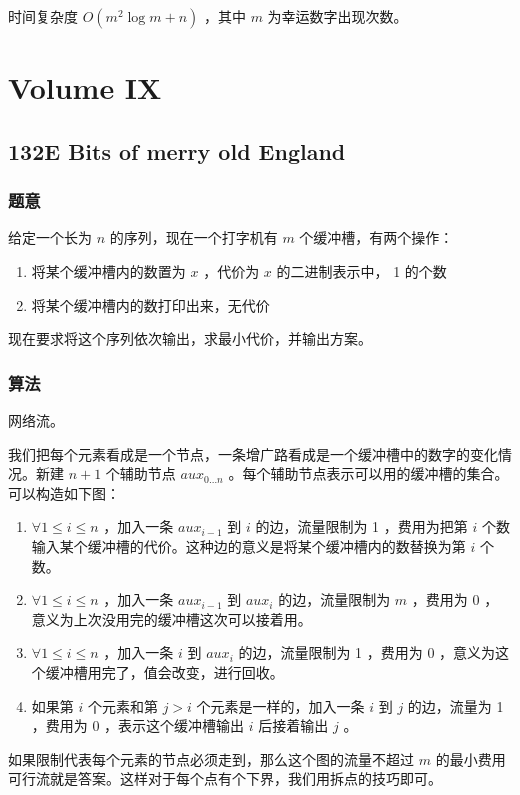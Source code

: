 \documentclass[11pt]{article}
\begin{document}
   时间复杂度 $O(m^2 \log m + n)$ ，其中 $m$ 为幸运数字出现次数。
\section{Volume IX}
\label{sec-9}
\subsection{132E  Bits of merry old England}
\label{sec-9-1}
\subsubsection{题意}
\label{sec-9-1-1}

    给定一个长为 $n$ 的序列，现在一个打字机有 $m$ 个缓冲槽，有两个操作：
\begin{enumerate}
\item 将某个缓冲槽内的数置为 $x$ ，代价为 $x$ 的二进制表示中， 1 的个数
\item 将某个缓冲槽内的数打印出来，无代价
\end{enumerate}
   现在要求将这个序列依次输出，求最小代价，并输出方案。
\subsubsection{算法}
\label{sec-9-1-2}

    网络流。

    我们把每个元素看成是一个节点，一条增广路看成是一个缓冲槽中的数字的变化情况。新建 $n + 1$ 个辅助节点 $aux_{0 \dots n}$ 。每个辅助节点表示可以用的缓冲槽的集合。可以构造如下图：
\begin{enumerate}
\item $\forall 1 \leq i \leq n$ ，加入一条 $aux_{i - 1}$ 到 $i$ 的边，流量限制为 1 ，费用为把第 $i$ 个数输入某个缓冲槽的代价。这种边的意义是将某个缓冲槽内的数替换为第 $i$ 个数。
\item $\forall 1 \leq i \leq n$ ，加入一条 $aux_{i - 1}$ 到 $aux_i$ 的边，流量限制为 $m$ ，费用为 0 ，意义为上次没用完的缓冲槽这次可以接着用。
\item $\forall 1 \leq i \leq n$ ，加入一条 $i$ 到 $aux_i$ 的边，流量限制为 1 ，费用为 0 ，意义为这个缓冲槽用完了，值会改变，进行回收。
\item 如果第 $i$ 个元素和第 $j > i$ 个元素是一样的，加入一条 $i$ 到 $j$ 的边，流量为 1 ，费用为 0 ，表示这个缓冲槽输出 $i$ 后接着输出 $j$ 。
\end{enumerate}

    如果限制代表每个元素的节点必须走到，那么这个图的流量不超过 $m$ 的最小费用可行流就是答案。这样对于每个点有个下界，我们用拆点的技巧即可。
\end{document}

